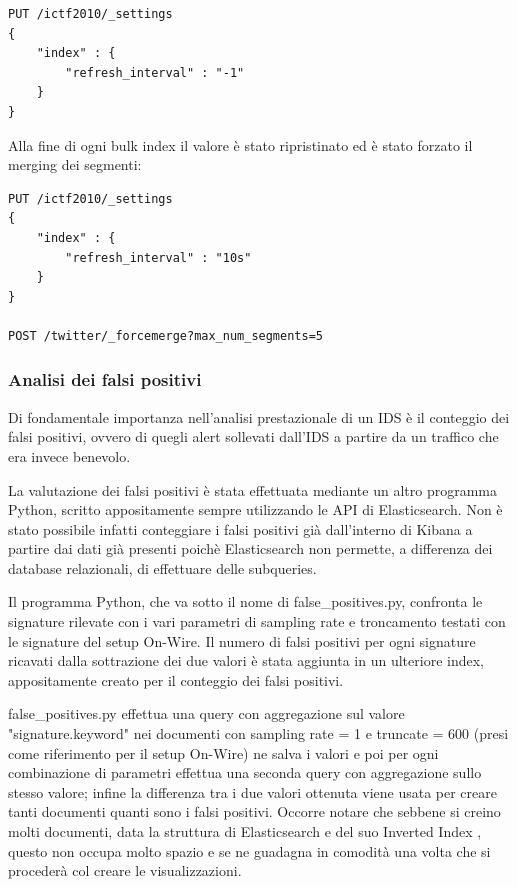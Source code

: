 \documentclass[12pt,a4paper,openright,twoside]{report}
\begin{document}
\newpage

\begin{verbatim}
PUT /ictf2010/_settings
{
    "index" : {
        "refresh_interval" : "-1"
    }
}
\end{verbatim}

Alla fine di ogni bulk index il valore \`e stato ripristinato ed \`e stato forzato
il merging dei segmenti:
\begin{verbatim}
PUT /ictf2010/_settings
{
    "index" : {
        "refresh_interval" : "10s"
    }
}

POST /twitter/_forcemerge?max_num_segments=5
\end{verbatim}

\subsubsection{Analisi dei falsi positivi}

Di fondamentale importanza nell'analisi prestazionale di un IDS \`e il conteggio
dei falsi positivi, ovvero di quegli alert sollevati dall'IDS a partire da un traffico
che era invece benevolo.

La valutazione dei falsi positivi \`e stata effettuata mediante un altro programma
Python, scritto appositamente sempre utilizzando le API di Elasticsearch.
Non \`e stato possibile infatti conteggiare i falsi positivi gi\`a dall'interno di
Kibana a partire dai dati gi\`a presenti poich\`e Elasticsearch non permette, a
differenza dei database relazionali, di effettuare delle subqueries.

Il programma Python, che va sotto il nome di false\_positives.py, confronta le signature
rilevate con i vari parametri di sampling rate e troncamento testati con le signature
del setup On-Wire. Il numero di falsi positivi per ogni signature ricavati dalla sottrazione dei
due valori \`e stata aggiunta in un ulteriore index, appositamente creato per il conteggio
dei falsi positivi.

false\_positives.py effettua una query con aggregazione sul valore "signature.keyword" nei
documenti con sampling rate = 1 e truncate = 600 (presi come riferimento per il setup On-Wire)
ne salva i valori e poi per ogni combinazione
di parametri effettua una seconda query con aggregazione sullo stesso valore; infine la differenza
tra i due valori ottenuta viene usata per creare tanti documenti quanti sono i falsi positivi.
Occorre notare che sebbene si creino molti documenti, data la struttura di Elasticsearch
e del suo Inverted Index \cite{EXP13}, questo non occupa molto spazio e se ne guadagna in comodit\`a una volta che
si proceder\`a col creare le visualizzazioni.
\end{document}
